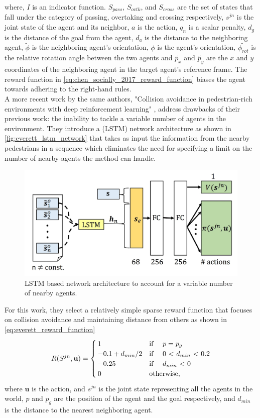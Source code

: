 where, $I$ is an indicator function. $S_{pass}$, $S_{ovtk}$, and $S_{cross}$ are the set of states that fall under the category of passing, overtaking and crossing respectively, $s^{jn}$ is the joint state of the agent and its neighbor, $a$ is the action, $q_{n}$ is a scalar penalty, $d_{g}$ is the distance of the goal from the agent, $d_{a}$ is the distance to the neighboring agent, $\tilde{\phi}$ is the neighboring agent's orientation, $\phi$ is the agent's orientation, $\tilde{\phi_{rot}}$ is the relative rotation angle between the two agents and $\tilde{p_x}$ and $\tilde{p_y}$ are the $x$ and $y$ coordinates of the neighboring agent in the target agent's reference frame. The reward function in \autoref{eq:chen_socially_2017_reward_function} biases the agent towards adhering to the right-hand rules.
\\

A more recent work by the same authors, "Collision avoidance in pedestrian-rich environments with deep reinforcement learning" \cite{everett_collision_2019}, 
address drawbacks of their previous work: the inability to tackle a variable number of agents in the environment. They introduce a  (LSTM) \cite{hochreiterLongShortTermMemory1997} network architecture as shown in \autoref{fig:everett_lstm_network} that takes as input the information from the nearby pedestrians in a sequence which eliminates the need for specifying a limit on the number of nearby-agents the method can handle.
\begin{figure}[!htbp]
	\centering
	\includegraphics[width=0.6\linewidth]{figures/everett}
	\caption{LSTM based network architecture to account for a variable number of nearby agents.}
	\label{fig:everett_lstm_network}
\end{figure}
 For this work, they select a relatively simple sparse reward function that focuses on collision avoidance and maintaining distance from others as shown in \autoref{eq:everett_reward_function}\\
\begin{align}
\label{eq:everett_reward_function}
R(S^{jn}, \mathbf{u}) = 
\begin{cases}
	 1 & \text{if \quad $p=p_g$} \\
	 -0.1+d_{min}/2 & \text{if \quad 0 < $d_{min}$ < 0.2} \\
	 -0.25 & \text{if \quad $d_{min}$ < 0}\\
	 0 & \text{otherwise}, 
\end{cases}
\end{align}
where $\mathbf{u}$ is the action, and $s^{jn}$ is the joint state representing all the agents in the world, $p$ and $p_{g}$ are the position of the agent and the goal respectively, and $d_{min}$ is the distance to the nearest neighboring agent.
